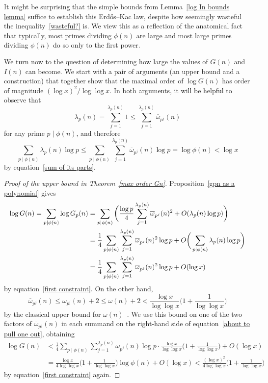\documentclass[12pt,reqno]{amsart}
\theoremstyle{definition}
\newcommand{\ovomega}{{\overline\omega}}
\begin{document}
It might be surprising that the simple bounds from Lemma~\ref{log In bounds lemma} suffice to establish this Erd{\H o}s--Kac law, despite how seemingly wasteful the inequality~\eqref{wasteful?} is. We view this as a reflection of the anatomical fact that typically, most primes dividing $\phi(n)$ are large and most large primes dividing $\phi(n)$ do so only to the first power.

We turn now to the question of determining how large the values of $G(n)$ and $I(n)$ can become. We start with a pair of arguments (an upper bound and a construction) that together show that the maximal order of $\log G(n)$ has order of magnitude ${(\log x)^2/\log\log x}$.
In both arguments, it will be helpful to observe that
\[
\lambda_p(n) = \sum_{j=1}^{\lambda_p(n)} 1 \le \sum_{j=1}^{\lambda_p(n)} \ovomega_{p^j}(n)
\]
for any prime $p\mid\phi(n)$, and therefore
\begin{equation}  \label{first constraint}
\sum_{p\mid\phi(n)} \lambda_p(n) \log p \le \sum_{p\mid\phi(n)} \sum_{j=1}^{\lambda_p(n)} \ovomega_{p^j}(n) \log p = \log\phi(n) < \log x
\end{equation}
by equation~\eqref{sum of its parts}.

\begin{proof}[Proof of the upper bound in Theorem~\ref{max order Gn}]
Proposition~\ref{gpn as a polynomial} gives
\begin{align}
\log G(n) = \sum_{p \mid \phi(n)} \log G_p(n) &= \sum_{p \mid \phi(n)} \bigg( \frac{\log p}4 \sum_{j=1}^{\lambda_p(n)} \ovomega_{p^j}(n)^2 + O(\lambda_p(n) \log p) \bigg) \notag \\
&= \frac14 \sum_{p \mid \phi(n)} \sum_{j=1}^{\lambda_p(n)} \ovomega_{p^j}(n)^2 \log p + O\bigg( \sum_{p \mid \phi(n)} \lambda_p(n) \log p \bigg) \notag \\
&= \frac14 \sum_{p \mid \phi(n)} \sum_{j=1}^{\lambda_p(n)} \ovomega_{p^j}(n)^2 \log p + O(\log x)
\label{about to pull one out}
\end{align}
by equation~\eqref{first constraint}. On the other hand,
\begin{equation}  \label{classical omega bound}
\ovomega_{p^j}(n) \leq \omega_{p^j}(n) + 2 \leq \omega(n) + 2 < \frac{\log x}{\log\log x} \bigg( 1 + \frac1{\log\log x} \bigg)
\end{equation}
by the classical upper bound for $\omega(n)$~\cite[Theorem 2.10]{mv07}. We use this bound on one of the two factors of $\ovomega_{p^j}(n)$ in each summand on the right-hand side of equation~\eqref{about to pull one out}, obtaining
\begin{align*}
\log G(n) &< \frac14 \sum_{p \mid \phi(n)} \sum_{j=1}^{\lambda_p(n)} \ovomega_{p^j}(n) \log p \cdot \frac{\log x}{\log\log x} \bigg( 1 + \frac1{\log\log x} \bigg) + O(\log x) \\
&= \frac{\log x}{4\log\log x} \bigg( 1 + \frac1{\log\log x} \bigg) \log \phi(n) + O(\log x) < \frac{(\log x)^2}{4\log\log x} \bigg( 1 + \frac1{\log\log x} \bigg)
\label{about to pull one out}
\end{align*}
by equation~\eqref{first constraint} again.
\end{proof}
\end{document}
